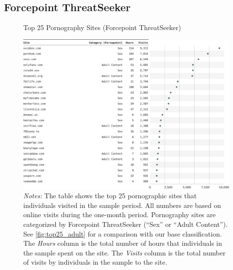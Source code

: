 \documentclass[12pt, letterpaper]{article}
\begin{document}
\subsection{Forcepoint ThreatSeeker}
\begin{figure}[ht]
	\centering
	\caption{Top 25 Pornography Sites (Forcepoint ThreatSeeker)}
	\includegraphics[width=\textwidth]{figs/top_25_adultsites_forcepoint_threatseeker.pdf}
	\caption*{\footnotesize \emph{Notes:} 
		The table shows the top 25 pornographic sites that individuals visited in the sample period.
            All numbers are based on online visits during the one-month period.
		Pornography sites are categorized by Forcepoint ThreatSeeker (``Sex'' or ``Adult Content'').
            See \cref{fig:top25_adult} for a comparison with our base classification.
    	The \emph{Hours} column is the total number of hours that individuals in the sample spent on the site. 
    	The \emph{Visits} column is the total number of visits by individuals in the sample to the site.            
	}
	\label{fig:top25_adult_forcepoint}
\end{figure}





\end{document}
